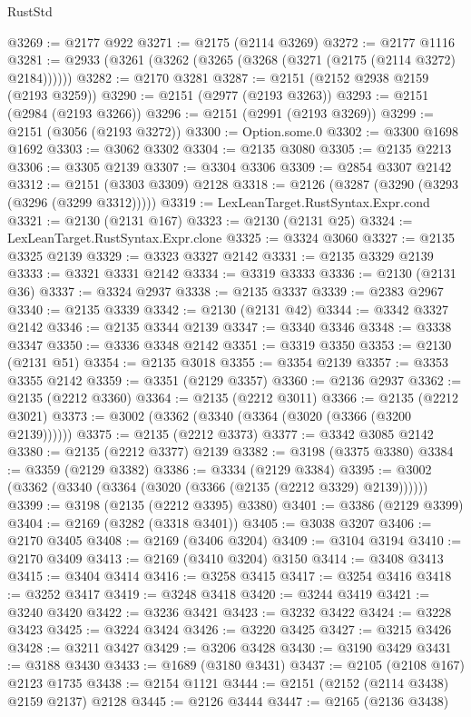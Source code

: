 \begin{lexlean}{RustStd}
\begin{coremodule}
@3269 := @2177 @922
@3271 := @2175 (@2114 @3269)
@3272 := @2177 @1116
@3281 := @2933 (@3261 (@3262 (@3265 (@3268 (@3271 (@2175 (@2114 @3272) @2184))))))
@3282 := @2170 @3281
@3287 := @2151 (@2152 @2938 @2159 (@2193 @3259))
@3290 := @2151 (@2977 (@2193 @3263))
@3293 := @2151 (@2984 (@2193 @3266))
@3296 := @2151 (@2991 (@2193 @3269))
@3299 := @2151 (@3056 (@2193 @3272))
@3300 := Option.some.{0}
@3302 := @3300 @1698 @1692
@3303 := @3062 @3302
@3304 := @2135 @3080
@3305 := @2135 @2213
@3306 := @3305 @2139
@3307 := @3304 @3306
@3309 := @2854 @3307 @2142
@3312 := @2151 (@3303 @3309) @2128
@3318 := @2126 (@3287 (@3290 (@3293 (@3296 (@3299 @3312)))))
@3319 := LexLeanTarget.RustSyntax.Expr.cond
@3321 := @2130 (@2131 @167)
@3323 := @2130 (@2131 @25)
@3324 := LexLeanTarget.RustSyntax.Expr.clone
@3325 := @3324 @3060
@3327 := @2135 @3325 @2139
@3329 := @3323 @3327 @2142
@3331 := @2135 @3329 @2139
@3333 := @3321 @3331 @2142
@3334 := @3319 @3333
@3336 := @2130 (@2131 @36)
@3337 := @3324 @2937
@3338 := @2135 @3337
@3339 := @2383 @2967
@3340 := @2135 @3339
@3342 := @2130 (@2131 @42)
@3344 := @3342 @3327 @2142
@3346 := @2135 @3344 @2139
@3347 := @3340 @3346
@3348 := @3338 @3347
@3350 := @3336 @3348 @2142
@3351 := @3319 @3350
@3353 := @2130 (@2131 @51)
@3354 := @2135 @3018
@3355 := @3354 @2139
@3357 := @3353 @3355 @2142
@3359 := @3351 (@2129 @3357)
@3360 := @2136 @2937
@3362 := @2135 (@2212 @3360)
@3364 := @2135 (@2212 @3011)
@3366 := @2135 (@2212 @3021)
@3373 := @3002 (@3362 (@3340 (@3364 (@3020 (@3366 (@3200 @2139))))))
@3375 := @2135 (@2212 @3373)
@3377 := @3342 @3085 @2142
@3380 := @2135 (@2212 @3377) @2139
@3382 := @3198 (@3375 @3380)
@3384 := @3359 (@2129 @3382)
@3386 := @3334 (@2129 @3384)
@3395 := @3002 (@3362 (@3340 (@3364 (@3020 (@3366 (@2135 (@2212 @3329) @2139))))))
@3399 := @3198 (@2135 (@2212 @3395) @3380)
@3401 := @3386 (@2129 @3399)
@3404 := @2169 (@3282 (@3318 @3401))
@3405 := @3038 @3207
@3406 := @2170 @3405
@3408 := @2169 (@3406 @3204)
@3409 := @3104 @3194
@3410 := @2170 @3409
@3413 := @2169 (@3410 @3204) @3150
@3414 := @3408 @3413
@3415 := @3404 @3414
@3416 := @3258 @3415
@3417 := @3254 @3416
@3418 := @3252 @3417
@3419 := @3248 @3418
@3420 := @3244 @3419
@3421 := @3240 @3420
@3422 := @3236 @3421
@3423 := @3232 @3422
@3424 := @3228 @3423
@3425 := @3224 @3424
@3426 := @3220 @3425
@3427 := @3215 @3426
@3428 := @3211 @3427
@3429 := @3206 @3428
@3430 := @3190 @3429
@3431 := @3188 @3430
@3433 := @1689 (@3180 @3431)
@3437 := @2105 (@2108 @167) @2123 @1735
@3438 := @2154 @1121
@3444 := @2151 (@2152 (@2114 @3438) @2159 @2137) @2128
@3445 := @2126 @3444
@3447 := @2165 (@2136 @3438)

\end{coremodule}
\end{lexlean}
